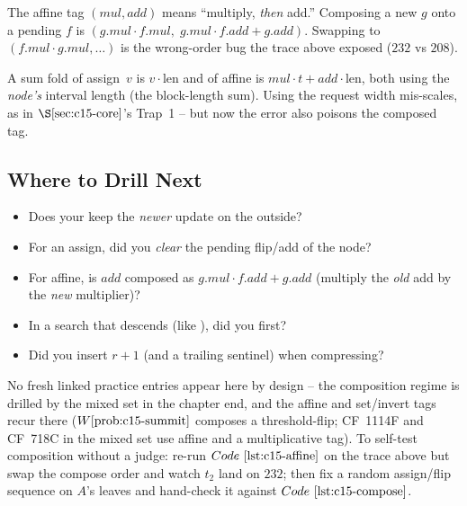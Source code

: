 \begin{warningbox}
The affine tag \((\mathit{mul},\mathit{add})\) means ``multiply, \emph{then} add.''  Composing a new \(g\) onto a pending \(f\) is \((g.\mathit{mul}\cdot f.\mathit{mul},\;g.\mathit{mul}\cdot f.\mathit{add}+g.\mathit{add})\).  Swapping to \((f.\mathit{mul}\cdot g.\mathit{mul},\dots)\) is the wrong-order bug the trace above exposed (\(232\) vs \(208\)).
\end{warningbox}

\begin{warningbox}
A sum fold of assign~\(v\) is \(v\cdot\text{len}\) and of affine is \(\mathit{mul}\cdot t+\mathit{add}\cdot\text{len}\), both using the \emph{node's} interval length (the block-length sum).  Using the request width mis-scales, as in \(\secref{c15-core}\)'s Trap~1 -- but now the error also poisons the composed tag.
\end{warningbox}

\subsection{Where to Drill Next}

\begin{stuckbox}
\begin{itemize}[nosep,leftmargin=1.4em]
  \item Does your  keep the \emph{newer} update on the outside?
  \item For an assign, did you \emph{clear} the pending flip/add of the node?
  \item For affine, is \(\mathit{add}\) composed as \(g.\mathit{mul}\cdot f.\mathit{add}+g.\mathit{add}\) (multiply the \emph{old} add by the \emph{new} multiplier)?
  \item In a search that descends (like ), did you  first?
  \item Did you insert \(r+1\) (and a trailing sentinel) when compressing?
\end{itemize}
\end{stuckbox}

No fresh linked practice entries appear here by design -- the composition regime is drilled by the mixed set in the chapter end, and the affine and set/invert tags recur there (\(\probref{c15-summit}\) composes a threshold-flip; CF~1114F and CF~718C in the mixed set use affine and a multiplicative tag).  To self-test composition without a judge: re-run \(\coderef{c15-affine}\) on the trace above but swap the compose order and watch \(t_2\) land on \(232\); then fix a random assign/flip sequence on \(A\)'s leaves and hand-check it against \(\coderef{c15-compose}\).

